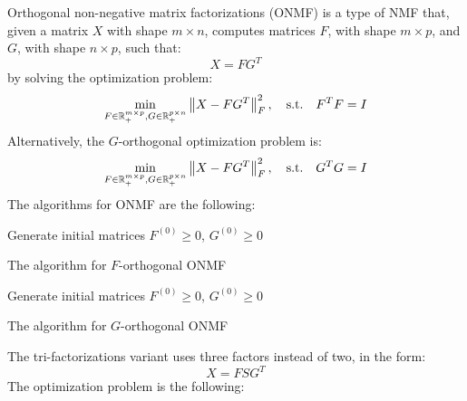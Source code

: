 Orthogonal non-negative matrix factorizations (ONMF) is a type of NMF that, given a matrix $X$ with shape $m \times n$, computes matrices $F$, with shape $m \times p$, and $G$, with shape $n \times p$, such that:
\begin{equation*}
X = FG^T
\end{equation*}
by solving the optimization problem:
\begin{equation*}
\min_{F \in \mathbb{R}^{m \times p}_+, G \in \mathbb{R}^{p \times n}_+} \left\lVert X - FG^T\right\rVert_F^2, \quad \text{s.t.} \quad F^TF = I
\end{equation*}
Alternatively, the $G$-orthogonal optimization problem is:
\begin{equation*}
\min_{F \in \mathbb{R}^{m \times p}_+, G \in \mathbb{R}^{p \times n}_+} \left\lVert X - FG^T\right\rVert_F^2, \quad \text{s.t.} \quad G^TG = I
\end{equation*}
The algorithms for ONMF are the following:
\vskip 0.7cm
\begin{algorithm}[H]
Generate initial matrices $F^{(0)} \geq 0$, $G^{(0)} \geq 0$\;
\caption{The algorithm for $F$-orthogonal ONMF}
\end{algorithm}
\vskip 0.7cm
\begin{algorithm}[H]
Generate initial matrices $F^{(0)} \geq 0$, $G^{(0)} \geq 0$\;
\caption{The algorithm for $G$-orthogonal ONMF}
\end{algorithm}
\vskip 0.7cm
The tri-factorizations \cite{10.1145/1150402.1150420} variant uses three factors instead of two, in the form:
\begin{equation*}
X = FSG^T
\end{equation*}
The optimization problem is the following:
